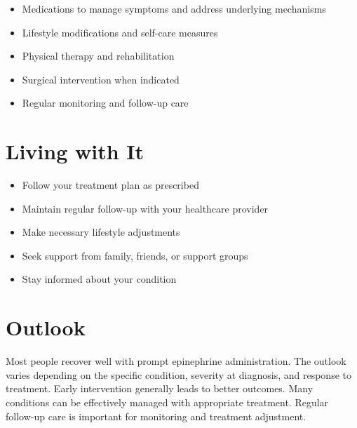 \begin{itemize}[noitemsep]
  \item Medications to manage symptoms and address underlying mechanisms
  \item Lifestyle modifications and self-care measures
  \item Physical therapy and rehabilitation
  \item Surgical intervention when indicated
  \item Regular monitoring and follow-up care
\end{itemize}
\section{Living with It}
\begin{itemize}[noitemsep]
  \item Follow your treatment plan as prescribed
  \item Maintain regular follow-up with your healthcare provider
  \item Make necessary lifestyle adjustments
  \item Seek support from family, friends, or support groups
  \item Stay informed about your condition
\end{itemize}
\section{Outlook}
Most people recover well with prompt epinephrine administration. The outlook varies depending on the specific condition, severity at diagnosis, and response to treatment. Early intervention generally leads to better outcomes. Many conditions can be effectively managed with appropriate treatment. Regular follow-up care is important for monitoring and treatment adjustment.
